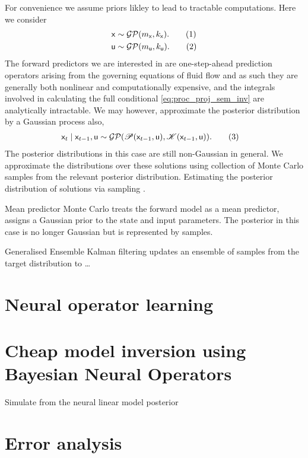 \documentclass{article}
\newcommand\numberthis{\addtocounter{equation}{1}\tag{\theequation}}
\newcommand{\rv}[1]{\mathsf{#1}}
\newcommand{\dist}[1]{\mathcal{#1}}
\newcommand{\op}[1]{\mathscr{#1}}
\newcommand{\gvn}{\mid}
\newcommand{\inp}{\rv{u}}
\newcommand{\state}{\rv{x}}
\begin{document}
For convenience we assume priors likley to lead to tractable computations.
Here we consider
\begin{align*}
\state &\sim \dist{GP}(m_{\state},k_{\state}).
\numberthis \label{eq:gp_approx_state} \\
\inp &\sim \dist{GP}(m_{\inp},k_{\inp}).
\numberthis \label{eq:gp_approx_prior} 
\end{align*}
The forward predictors we are interested in are one-step-ahead prediction operators arising from the governing equations of fluid flow and as such they are generally both nonlinear and computationally expensive, and the integrals involved in calculating the full conditional \eqref{eq:proc_proj_sem_inv} are analytically intractable.
We may however, approximate the posterior distribution by a Gaussian process also,
\begin{align*}
    \state_{t} \gvn \state_{t-1},\inp
&\sim \dist{GP}(\op{P}(\state_{t-1},\inp ), \op{K}(\state_{t-1},\inp )).
\numberthis \label{eq:gp_approx_proc} 
\end{align*}
The posterior distributions in this case are still non-Gaussian in general.
We approximate the distributions over these solutions using collection of Monte Carlo samples from the relevant posterior distribution.
Estimating the posterior distribution of solutions via sampling \cite{EvensenData2009,TarantolaInverse2005}.

Mean predictor Monte Carlo treats the forward model as a mean predictor, assigns a Gaussian prior to the state and input parameters.
The posterior in this case is no longer Gaussian but is represented by samples.

Generalised Ensemble Kalman filtering updates an ensemble of samples from the target distribution to \dots

\section{Neural operator learning}

\section{Cheap model inversion using Bayesian Neural Operators}

Simulate from the neural linear model posterior

\section{Error analysis}
\end{document}
